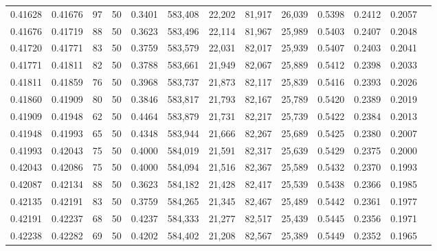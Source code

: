 \begin{tabular}{rrrrrrrrrrrrr}
0.41628 & 0.41676 &    97 &  50 &                                     0.3401 & 583,408 &  22,202 &  81,917 &  26,039 & 0.5398 & 0.2412 & 0.2057 \\
0.41676 & 0.41719 &    88 &  50 &                                     0.3623 & 583,496 &  22,114 &  81,967 &  25,989 & 0.5403 & 0.2407 & 0.2048 \\
0.41720 & 0.41771 &    83 &  50 &                                     0.3759 & 583,579 &  22,031 &  82,017 &  25,939 & 0.5407 & 0.2403 & 0.2041 \\
0.41771 & 0.41811 &    82 &  50 &                                     0.3788 & 583,661 &  21,949 &  82,067 &  25,889 & 0.5412 & 0.2398 & 0.2033 \\
0.41811 & 0.41859 &    76 &  50 &                                     0.3968 & 583,737 &  21,873 &  82,117 &  25,839 & 0.5416 & 0.2393 & 0.2026 \\
0.41860 & 0.41909 &    80 &  50 &                                     0.3846 & 583,817 &  21,793 &  82,167 &  25,789 & 0.5420 & 0.2389 & 0.2019 \\
0.41909 & 0.41948 &    62 &  50 &                                     0.4464 & 583,879 &  21,731 &  82,217 &  25,739 & 0.5422 & 0.2384 & 0.2013 \\
0.41948 & 0.41993 &    65 &  50 &                                     0.4348 & 583,944 &  21,666 &  82,267 &  25,689 & 0.5425 & 0.2380 & 0.2007 \\
0.41993 & 0.42043 &    75 &  50 &                                     0.4000 & 584,019 &  21,591 &  82,317 &  25,639 & 0.5429 & 0.2375 & 0.2000 \\
0.42043 & 0.42086 &    75 &  50 &                                     0.4000 & 584,094 &  21,516 &  82,367 &  25,589 & 0.5432 & 0.2370 & 0.1993 \\
0.42087 & 0.42134 &    88 &  50 &                                     0.3623 & 584,182 &  21,428 &  82,417 &  25,539 & 0.5438 & 0.2366 & 0.1985 \\
0.42135 & 0.42191 &    83 &  50 &                                     0.3759 & 584,265 &  21,345 &  82,467 &  25,489 & 0.5442 & 0.2361 & 0.1977 \\
0.42191 & 0.42237 &    68 &  50 &                                     0.4237 & 584,333 &  21,277 &  82,517 &  25,439 & 0.5445 & 0.2356 & 0.1971 \\
0.42238 & 0.42282 &    69 &  50 &                                     0.4202 & 584,402 &  21,208 &  82,567 &  25,389 & 0.5449 & 0.2352 & 0.1965 \\

\end{tabular}
